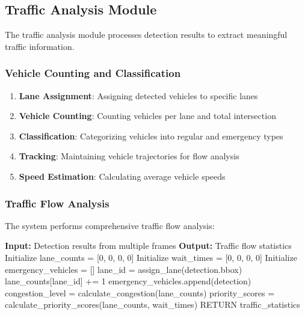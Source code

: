 \subsection{Traffic Analysis Module}

The traffic analysis module processes detection results to extract meaningful traffic information.

\subsubsection{Vehicle Counting and Classification}

\begin{enumerate}
    \item \textbf{Lane Assignment}: Assigning detected vehicles to specific lanes
    \item \textbf{Vehicle Counting}: Counting vehicles per lane and total intersection
    \item \textbf{Classification}: Categorizing vehicles into regular and emergency types
    \item \textbf{Tracking}: Maintaining vehicle trajectories for flow analysis
    \item \textbf{Speed Estimation}: Calculating average vehicle speeds
\end{enumerate}

\subsubsection{Traffic Flow Analysis}

The system performs comprehensive traffic flow analysis:

\begin{algorithmic}[1]
\STATE \textbf{Input:} Detection results from multiple frames
\STATE \textbf{Output:} Traffic flow statistics
\STATE 
\STATE Initialize lane\_counts = [0, 0, 0, 0]  
\STATE Initialize wait\_times = [0, 0, 0, 0]
\STATE Initialize emergency\_vehicles = []
\STATE 
{}
    \STATE lane\_id = assign\_lane(detection.bbox)
    \STATE lane\_counts[lane\_id] += 1
    \STATE 
        \STATE emergency\_vehicles.append(detection)
    \ENDIF
\ENDFOR
\STATE 
\STATE congestion\_level = calculate\_congestion(lane\_counts)
\STATE priority\_scores = calculate\_priority\_scores(lane\_counts, wait\_times)
\STATE 
\STATE RETURN traffic\_statistics
\end{algorithmic}

